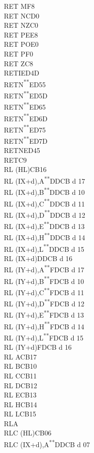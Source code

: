 \documentclass[12pt,twoside,openright,a4paper]{book}
\newcommand{\UNDOC}{\textnormal{\textsuperscript{**}}}
\begin{document}
\begin{multicols}{3}
{\begin{tabbing}
	RET M\>F8\\
	RET NC\>D0\\
	RET NZ\>C0\\
	RET PE\>E8\\
	RET PO\>E0\\
	RET P\>F0\\
	RET Z\>C8\\
	RETI\>ED4D\\
	RETN\UNDOC\>ED55\\
	RETN\UNDOC\>ED5D\\
	RETN\UNDOC\>ED65\\
	RETN\UNDOC\>ED6D\\
	RETN\UNDOC\>ED75\\
	RETN\UNDOC\>ED7D\\
	RETN\>ED45\\
	RET\>C9\\
	RL (HL)\>CB16\\
	RL (IX+d),A\UNDOC\>DDCB d 17\\
	RL (IX+d),B\UNDOC\>DDCB d 10\\
	RL (IX+d),C\UNDOC\>DDCB d 11\\
	RL (IX+d),D\UNDOC\>DDCB d 12\\
	RL (IX+d),E\UNDOC\>DDCB d 13\\
	RL (IX+d),H\UNDOC\>DDCB d 14\\
	RL (IX+d),L\UNDOC\>DDCB d 15\\
	RL (IX+d)\>DDCB d 16\\
	RL (IY+d),A\UNDOC\>FDCB d 17\\
	RL (IY+d),B\UNDOC\>FDCB d 10\\
	RL (IY+d),C\UNDOC\>FDCB d 11\\
	RL (IY+d),D\UNDOC\>FDCB d 12\\
	RL (IY+d),E\UNDOC\>FDCB d 13\\
	RL (IY+d),H\UNDOC\>FDCB d 14\\
	RL (IY+d),L\UNDOC\>FDCB d 15\\
	RL (IY+d)\>FDCB d 16\\
	RL A\>CB17\\
	RL B\>CB10\\
	RL C\>CB11\\
	RL D\>CB12\\
	RL E\>CB13\\
	RL H\>CB14\\
	RL L\>CB15\\
	RLA\\
	RLC (HL)\>CB06\\
	RLC (IX+d),A\UNDOC\>DDCB d 07\\

\end{tabbing}}
\end{multicols}
\end{document}
